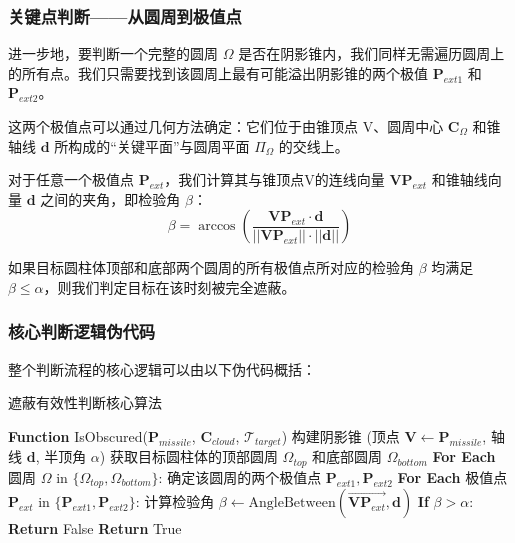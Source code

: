 \documentclass[fontset=SimSun]{ctexart}
\begin{document}
\subsubsection{关键点判断——从圆周到极值点}
进一步地，要判断一个完整的圆周 $\Omega$ 是否在阴影锥内，我们同样无需遍历圆周上的所有点。我们只需要找到该圆周上最有可能溢出阴影锥的两个极值 $\mathbf{P}_{ext1}$ 和 $\mathbf{P}_{ext2}$。

这两个极值点可以通过几何方法确定：它们位于由锥顶点 V、圆周中心 $\mathbf{C}_{\Omega}$ 和锥轴线 $\mathbf{d}$ 所构成的“关键平面”与圆周平面 $\Pi_{\Omega}$ 的交线上。

对于任意一个极值点 $\mathbf{P}_{ext}$，我们计算其与锥顶点V的连线向量 $\mathbf{V}\mathbf{P}_{ext}$ 和锥轴线向量 $\mathbf{d}$ 之间的夹角，即检验角 $\beta$：
\begin{equation}
\beta = \arccos\left( \frac{\mathbf{V}\mathbf{P}_{ext} \cdot \mathbf{d}}{||\mathbf{V}\mathbf{P}_{ext}|| \cdot ||\mathbf{d}||} \right)
\end{equation}

如果目标圆柱体顶部和底部两个圆周的所有极值点所对应的检验角 $\beta$ 均满足 $\beta \le \alpha$，则我们判定目标在该时刻被完全遮蔽。

\subsubsection{核心判断逻辑伪代码}
整个判断流程的核心逻辑可以由以下伪代码概括：

\begin{algorithm}[H]
\caption{遮蔽有效性判断核心算法}
\begin{algorithmic}[1]
\STATE \textbf{Function} IsObscured($\mathbf{P}_{missile}$, $\mathbf{C}_{cloud}$, $\mathcal{T}_{target}$)
\STATE   构建阴影锥 (顶点 $\mathbf{V} \leftarrow \mathbf{P}_{missile}$, 轴线 $\mathbf{d}$, 半顶角 $\alpha$)
\STATE   获取目标圆柱体的顶部圆周 $\Omega_{top}$ 和底部圆周 $\Omega_{bottom}$
\STATE   \textbf{For Each} 圆周 $\Omega$ in $\{\Omega_{top}, \Omega_{bottom}\}$:
\STATE     \quad 确定该圆周的两个极值点 $\mathbf{P}_{ext1}, \mathbf{P}_{ext2}$
\STATE     \quad \textbf{For Each} 极值点 $\mathbf{P}_{ext}$ in $\{\mathbf{P}_{ext1}, \mathbf{P}_{ext2}\}$:
\STATE     \qquad   计算检验角 $\beta \leftarrow \text{AngleBetween}(\vec{\mathbf{V}\mathbf{P}_{ext}}, \mathbf{d})$
\STATE     \qquad   \textbf{If} $\beta > \alpha$:
\STATE     \qquad     \quad \textbf{Return} False  
\STATE   \textbf{Return} True  
\end{algorithmic}
\end{algorithm}
\end{document}
